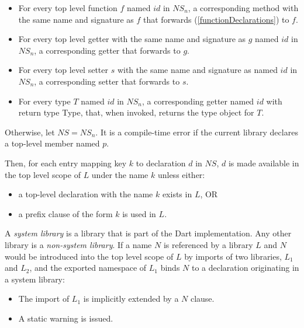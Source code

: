 \documentclass{article}
\newcommand{\code}[1]{{\sf #1}}
\begin{document}
\begin{itemize}
\item  For every top level function $f$ named $id$ in $NS_n$, a corresponding method with the same name and signature as $f$ that forwards  (\ref{functionDeclarations}) to $f$.
\item For every top level getter  with the same name and signature as $g$ named $id$ in $NS_n$, a corresponding getter  that forwards to $g$.
\item For every top level setter $s$  with the same name and signature as named $id$ in $NS_n$, a corresponding setter  that forwards to  $s$.
\item For every type $T$ named $id$ in $NS_n$, a corresponding getter named $id$ with return type \code{Type}, that, when invoked, returns the type object for $T$.
\end{itemize}

\LMHash{}
Otherwise, let $NS = NS_n$.
It is a compile-time error if the current library declares a top-level member named $p$.


\LMHash{}
Then, for each entry mapping key $k$ to declaration $d$ in $NS$,  $d$ is made available in the top level scope of $L$ under the name $k$ unless either:
\begin{itemize}
\item
a top-level declaration with the name $k$ exists in $L$, OR
\item a prefix clause of the form  \AS{} $k$ is used in $L$.
\end{itemize}


\LMHash{}
A {\em system library} is a library that is part of the Dart implementation. Any other library is a {\em non-system library}. If a name $N$ is referenced by a library $L$ and $N$ would be introduced into the top level scope of $L$ by 
imports of two libraries, $L_1$ and $L_2$, and the exported namespace of $L_1$ binds $N$ to a declaration originating in a system library:

\begin{itemize}
\item The import of $L_1$ is implicitly extended by a \code{\HIDE{} $N$} clause.
\item A static warning is issued.
\end{itemize}
\end{document}
